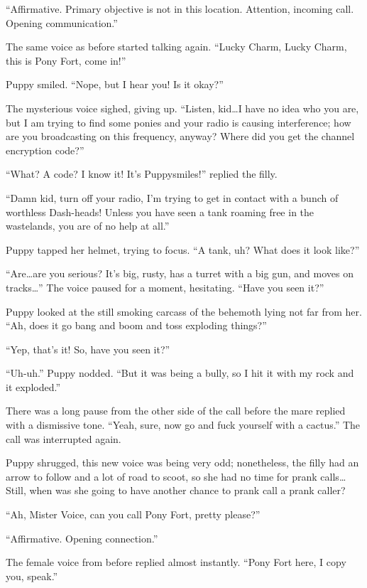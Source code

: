 ``{\mt Affirmative. Primary objective is not in this location. Attention, incoming call. Opening communication.}''

The same voice as before started talking again. ``Lucky Charm, Lucky Charm, this is Pony Fort, come in!''

Puppy smiled. ``Nope, but I hear you! Is it okay?''

The mysterious voice sighed, giving up. ``Listen, kid\dots I have no idea who you are, but I am trying to find some ponies and your radio is causing interference; how are you broadcasting on this frequency, anyway? Where did you get the channel encryption code?''

``What? A code? I know it! It's Puppysmiles!'' replied the filly.

``Damn kid, turn off your radio, I'm trying to get in contact with a bunch of worthless Dash-heads! Unless you have seen a tank roaming free in the wastelands, you are of no help at all.''

Puppy tapped her helmet, trying to focus. ``A tank, uh? What does it look like?''

``Are\dots are you serious? It's big, rusty, has a turret with a big gun, and moves on tracks\dots'' The voice paused for a moment, hesitating. ``Have you seen it?''

Puppy looked at the still smoking carcass of the behemoth lying not far from her. ``Ah, does it go bang and boom and toss exploding things?''

``Yep, that's it! So, have you seen it?''

``Uh-uh.'' Puppy nodded. ``But it was being a bully, so I hit it with my rock and it exploded.''

There was a long pause from the other side of the call before the mare replied with a dismissive tone. ``Yeah, sure, now go and fuck yourself with a cactus.'' The call was interrupted again.

Puppy shrugged, this new voice was being very odd; nonetheless, the filly had an arrow to follow and a lot of road to scoot, so she had no time for prank calls\dots Still, when was she going to have another chance to prank call a prank caller?

``Ah, Mister Voice, can you call Pony Fort, pretty please?''

``{\mt Affirmative. Opening connection.}''

The female voice from before replied almost instantly. ``Pony Fort here, I copy you, speak.''

